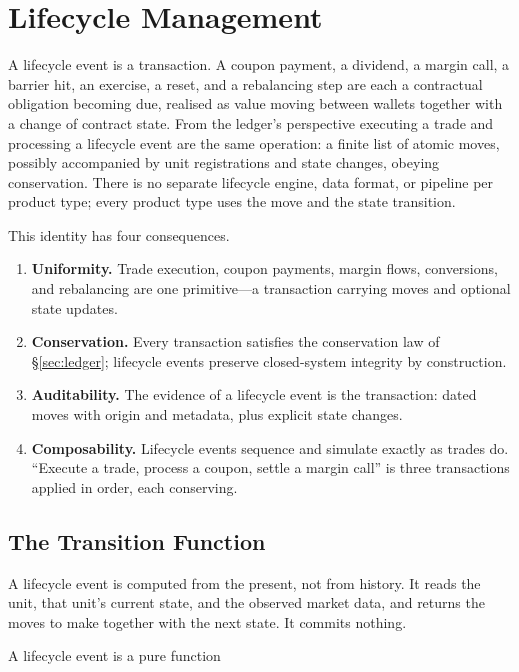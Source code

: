 \section{Lifecycle Management}
\label{sec:sec07}
\label{sec:lifecycle}

A lifecycle event is a transaction. A coupon payment, a dividend, a margin call, a barrier hit, an exercise, a reset, and a rebalancing step are each a contractual obligation becoming due, realised as value moving between wallets together with a change of contract state. From the ledger's perspective executing a trade and processing a lifecycle event are the same operation: a finite list of atomic moves, possibly accompanied by unit registrations and state changes, obeying conservation. There is no separate lifecycle engine, data format, or pipeline per product type; every product type uses the move and the state transition.

This identity has four consequences.

\begin{enumerate}[nosep]
\item \textbf{Uniformity.} Trade execution, coupon payments, margin flows, conversions, and rebalancing are one primitive---a transaction carrying moves and optional state updates.
\item \textbf{Conservation.} Every transaction satisfies the conservation law of \S\ref{sec:ledger}; lifecycle events preserve closed-system integrity by construction.
\item \textbf{Auditability.} The evidence of a lifecycle event is the transaction: dated moves with origin and metadata, plus explicit state changes.
\item \textbf{Composability.} Lifecycle events sequence and simulate exactly as trades do. ``Execute a trade, process a coupon, settle a margin call'' is three transactions applied in order, each conserving.
\end{enumerate}

\subsection{The Transition Function}

A lifecycle event is computed from the present, not from history. It reads the unit, that unit's current state, and the observed market data, and returns the moves to make together with the next state. It commits nothing.

A lifecycle event is a pure function

